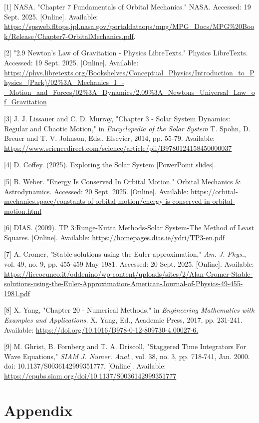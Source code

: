 \documentclass[11 pt, a4paper, twocolumn]{article}
\begin{document}
[1] NASA. "Chapter 7 Fundamentals of Orbital Mechanics." NASA. Accessed: 19 Sept. 2025. [Online]. Available: \url{https://spsweb.fltops.jpl.nasa.gov/portaldataops/mpg/MPG_Docs/MPG%20Book/Release/Chapter7-OrbitalMechanics.pdf}.

[2] "2.9 Newton's Law of Gravitation - Physics LibreTexts." Physics LibreTexts. Accessed: 19 Sept. 2025. [Online]. Available: \url{https://phys.libretexts.org/Bookshelves/Conceptual_Physics/Introduction_to_Physics_(Park)/02%3A_Mechanics_I_-_Motion_and_Forces/02%3A_Dynamics/2.09%3A_Newtons_Universal_Law_of_Gravitation}

[3] J. J. Lissauer and C. D. Murray, "Chapter 3 - Solar System Dynamics: Regular and Chaotic Motion," in \textit{Encyclopedia of the Solar System} T. Spohn, D. Breuer and T. V. Johnson, Eds., Elsevier, 2014, pp. 55-79. Available: \url{https://www.sciencedirect.com/science/article/pii/B9780124158450000037}

[4] D. Coffey. (2025). Exploring the Solar System [PowerPoint slides].

[5] B. Weber. "Energy Is Conserved In Orbital Motion." Orbital Mechanics \& Astrodynamics. Accessed: 20 Sept. 2025. [Online]. Available: \url{https://orbital-mechanics.space/constants-of-orbital-motion/energy-is-conserved-in-orbital-motion.html}

[6] DIAS. (2009). TP 3:Runge-Kutta Methods-Solar System-The Method of Least Squares. [Online]. Available: \url{https://homepages.dias.ie/ydri/TP3-en.pdf}

[7] A. Cromer, "Stable solutions using the Euler approximation," \textit{Am. J. Phys.}, vol. 49, no. 9, pp. 455-459 May 1981. Accessed: 20 Sept. 2025. [Online]. Available: \url{https://liceocuneo.it/oddenino/wp-content/uploads/sites/2/Alan-Cromer-Stable-solutions-using-the-Euler-Approximation-American-Journal-of-Physics-49-455-1981.pdf}

[8] X. Yang, "Chapter 20 - Numerical Methods," in \textit{Engineering Mathematics with Examples and Applications.} X. Yang, Ed., Academic Press, 2017, pp. 231-241. Available: \url{https://doi.org/10.1016/B978-0-12-809730-4.00027-6.}

[9] M. Ghrist, B. Fornberg and T. A. Driscoll, "Staggered Time Integrators For Wave Equations," \textit{SIAM J. Numer. Anal.}, vol. 38, no. 3, pp. 718-741, Jan. 2000. doi: 10.1137/S0036142999351777. [Online]. Available: \url{https://epubs.siam.org/doi/10.1137/S0036142999351777}
\newpage
\onecolumn
\section{Appendix}
\end{document}
